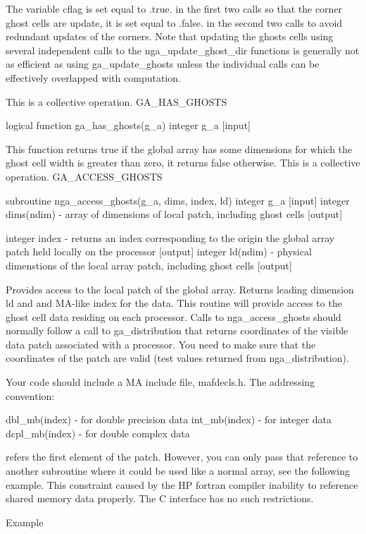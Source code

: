 The variable cflag is set equal to .true. in the first two calls so
that the corner ghost cells are update, it is set equal to .false.
in the second two calls to avoid redundant updates of the corners.
Note that updating the ghosts cells using several independent calls
to the nga\_update\_ghost\_dir functions is generally not as efficient
as using ga\_update\_ghosts unless the individual calls can be effectively
overlapped with computation.

This is a collective operation. GA\_HAS\_GHOSTS

logical function ga\_has\_ghosts(g\_a) integer g\_a {[}input{]}

This function returns true if the global array has some dimensions
for which the ghost cell width is greater than zero, it returns false
otherwise. This is a collective operation. GA\_ACCESS\_GHOSTS

subroutine nga\_access\_ghosts(g\_a, dims, index, ld) integer g\_a
{[}input{]} integer dims(ndim) - array of dimensions of local patch,
including ghost cells {[}output{]}

integer index - returns an index corresponding to the origin the global
array patch held locally on the processor {[}output{]} integer ld(ndim)
- physical dimenstions of the local array patch, including ghost cells
{[}output{]}

Provides access to the local patch of the global array. Returns leading
dimension ld and and MA-like index for the data. This routine will
provide access to the ghost cell data residing on each processor.
Calls to nga\_access\_ghosts should normally follow a call to ga\_distribution
that returns coordinates of the visible data patch associated with
a processor. You need to make sure that the coordinates of the patch
are valid (test values returned from nga\_distribution).

Your code should include a MA include file, mafdecls.h. The addressing
convention:

dbl\_mb(index) - for double precision data int\_mb(index) - for integer
data dcpl\_mb(index) - for double complex data

refers the first element of the patch. However, you can only pass
that reference to another subroutine where it could be used like a
normal array, see the following example. This constraint caused by
the HP fortran compiler inability to reference shared memory data
properly. The C interface has no such restrictions.

Example

